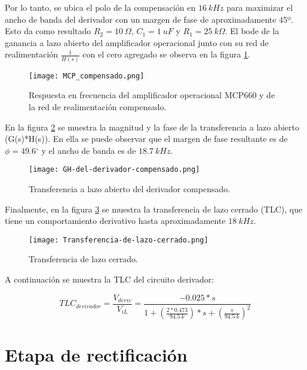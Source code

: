 Por lo tanto, se ubica el polo de la compensación en $16\:kHz$ para maximizar el ancho de banda del derivador con un margen de fase de aproximadamente 45º. Esto da como resultado $R_2=10\:\Omega$, $C_1=1\:uF$ y $R_1=25\: k\Omega$. El bode de la ganancia a lazo abierto del amplificador operacional junto con su red de realimentación $\frac{1}{H(s)}$ con el cero agregado se observa en la figura \ref{fig:img_MCP_compensado}.

\begin{figure}[H]
	\centering
	\texttt{[image: MCP\_compensado.png]}
	\caption{Respuesta en frecuencia del amplificador operacional MCP660 y de la red de realimentación compensado.}
	\label{fig:img_MCP_compensado}
\end{figure}

En la figura \ref{fig:img_GH del derivador compensado} se muestra la magnitud y la fase de la transferencia a lazo abierto (G(s)*H(s)). En ella se puede observar que el margen de fase resultante es de $\phi =49.6{}^\circ $ y el ancho de banda es de $18.7\:kHz$.

\begin{figure}[H]
	\centering
	\texttt{[image: GH-del-derivador-compensado.png]}
	\caption{Transferencia a lazo abierto del derivador compensado.}
	\label{fig:img_GH del derivador compensado}
\end{figure}

Finalmente, en la figura \ref{fig:img_Transferencia-de-lazo-cerrado} se muestra la transferencia de lazo cerrado (TLC), que tiene un comportamiento derivativo hasta aproximadamente $18 \:kHz$. 


\begin{figure}[H]
	\centering
	\texttt{[image: Transferencia-de-lazo-cerrado.png]}
	\caption{Transferencia de lazo cerrado.}
	\label{fig:img_Transferencia-de-lazo-cerrado}
\end{figure}


A continuación se muestra la TLC del circuito derivador:

\begin{equation} \label{eq_TLC_derivador}
	{TLC}_{derivador}=\frac{V_{deriv}}{V_{iL}}=\frac{-0.025*s}{1+(\frac{2*0.473}{94.5\: k})*s+(\frac{s}{94.5\:k})^2}
\end{equation} 

\section{Etapa de rectificación}

